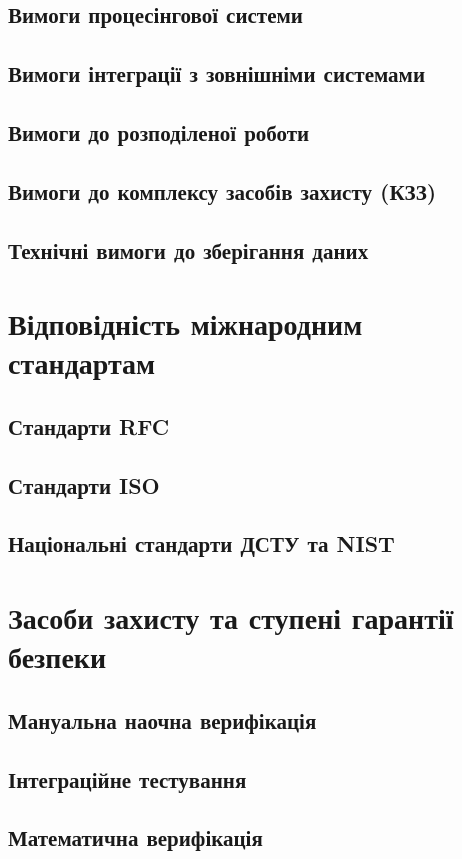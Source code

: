 \subsection{Вимоги процесінгової системи}

\subsection{Вимоги інтеграції з зовнішніми системами}

\subsection{Вимоги до розподіленої роботи}

\subsection{Вимоги до комплексу засобів захисту (КЗЗ)}

\subsection{Технічні вимоги до зберігання даних}

\section{Відповідність міжнародним стандартам}

\subsection{Стандарти RFC}

\subsection{Стандарти ISO}

\subsection{Національні стандарти ДСТУ та NIST}

\section{Засоби захисту та ступені гарантії безпеки}

\subsection{Мануальна наочна верифікація}

\subsection{Інтеграційне тестування}

\subsection{Математична верифікація}

